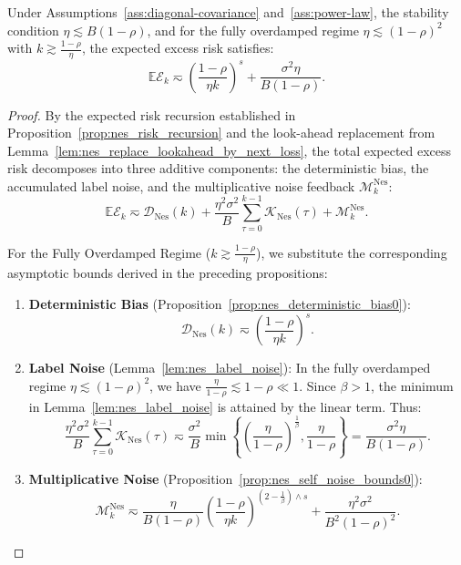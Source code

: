 \begin{theorem}
\label{thm:nes_scaling_sgd}
Under Assumptions~\ref{ass:diagonal-covariance} and~\ref{ass:power-law}, the stability condition $\eta \lesssim B(1-\rho)$, and for the fully overdamped regime $\eta\lesssim(1-\rho)^2$ with $k \gtrsim \frac{1-\rho}{\eta}$, the expected excess risk satisfies:
\[
    \mathbb{E}\mathcal E_k
    \eqsim
    \left(\frac{1-\rho}{\eta k}\right)^s
    +
    \frac{\sigma^2\eta}{B(1-\rho)}.
\]
\end{theorem}

\begin{proof}
By the expected risk recursion established in Proposition~\ref{prop:nes_risk_recursion} and the look-ahead replacement from Lemma~\ref{lem:nes_replace_lookahead_by_next_loss}, the total expected excess risk decomposes into three additive components: the deterministic bias, the accumulated label noise, and the multiplicative noise feedback $\mathcal{M}_k^{\mathrm{Nes}}$:
\[
    \mathbb{E}\mathcal E_k
    \eqsim
    \mathcal{D}_{\mathrm{Nes}}(k)
    +
    \frac{\eta^2\sigma^2}{B}\sum_{\tau=0}^{k-1}\mathcal{K}_{\mathrm{Nes}}(\tau)
    +
    \mathcal M_k^{\mathrm{Nes}}.
\]

For the Fully Overdamped Regime ($k \gtrsim \frac{1-\rho}{\eta}$), we substitute the corresponding asymptotic bounds derived in the preceding propositions:
\begin{enumerate}
    \item \textbf{Deterministic Bias} (Proposition~\ref{prop:nes_deterministic_bias0}):
    \[
        \mathcal{D}_{\mathrm{Nes}}(k) \eqsim \left(\frac{1-\rho}{\eta k}\right)^s.
    \]
    \item \textbf{Label Noise} (Lemma~\ref{lem:nes_label_noise}): 
    In the fully overdamped regime $\eta \lesssim (1-\rho)^2$, we have $\frac{\eta}{1-\rho} \lesssim 1-\rho \ll 1$. Since $\beta > 1$, the minimum in Lemma~\ref{lem:nes_label_noise} is attained by the linear term. Thus:
    \[
        \frac{\eta^2\sigma^2}{B}\sum_{\tau=0}^{k-1}\mathcal{K}_{\mathrm{Nes}}(\tau) 
        \eqsim \frac{\sigma^2}{B} \min\left\{ \left(\frac{\eta}{1-\rho}\right)^{\frac1\beta}, \frac{\eta}{1-\rho} \right\} 
        = \frac{\sigma^2\eta}{B(1-\rho)}.
    \]
    \item \textbf{Multiplicative Noise} (Proposition~\ref{prop:nes_self_noise_bounds0}):
    \[
        \mathcal M_k^{\mathrm{Nes}} \eqsim \frac{\eta}{B(1-\rho)} \left(\frac{1-\rho}{\eta k}\right)^{\left(2-\frac1\beta\right)\wedge s} + \frac{\eta^2\sigma^2}{B^2(1-\rho)^2}.
    \]
\end{enumerate}


\end{proof}
